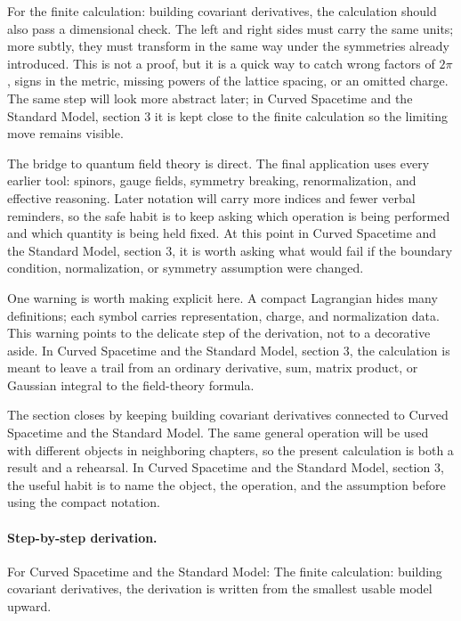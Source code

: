 For the finite calculation: building covariant derivatives, the calculation should also pass a dimensional check.  The left and right sides must carry the same units; more subtly, they must transform in the same way under the symmetries already introduced.  This is not a proof, but it is a quick way to catch wrong factors of \(2\pi\), signs in the metric, missing powers of the lattice spacing, or an omitted charge.  The same step will look more abstract later; in Curved Spacetime and the Standard Model, section 3 it is kept close to the finite calculation so the limiting move remains visible.

The bridge to quantum field theory is direct.  The final application uses every earlier tool: spinors, gauge fields, symmetry breaking, renormalization, and effective reasoning.  Later notation will carry more indices and fewer verbal reminders, so the safe habit is to keep asking which operation is being performed and which quantity is being held fixed.  At this point in Curved Spacetime and the Standard Model, section 3, it is worth asking what would fail if the boundary condition, normalization, or symmetry assumption were changed.

One warning is worth making explicit here.  A compact Lagrangian hides many definitions; each symbol carries representation, charge, and normalization data.  This warning points to the delicate step of the derivation, not to a decorative aside.  In Curved Spacetime and the Standard Model, section 3, the calculation is meant to leave a trail from an ordinary derivative, sum, matrix product, or Gaussian integral to the field-theory formula.

The section closes by keeping building covariant derivatives connected to Curved Spacetime and the Standard Model.  The same general operation will be used with different objects in neighboring chapters, so the present calculation is both a result and a rehearsal.  In Curved Spacetime and the Standard Model, section 3, the useful habit is to name the object, the operation, and the assumption before using the compact notation.



\paragraph{Step-by-step derivation.}

For Curved Spacetime and the Standard Model: The finite calculation: building covariant derivatives, the derivation is written from the smallest usable model upward.

